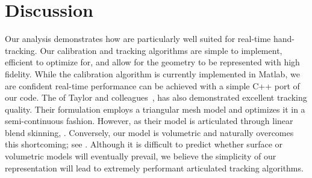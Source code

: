 

\section{Discussion}
\label{sec:discussion}


Our analysis demonstrates how  are particularly well suited for real-time hand-tracking. Our calibration and tracking algorithms are simple to implement, efficient to optimize for, and allow for the geometry to be represented with high fidelity. 
While the calibration algorithm is currently implemented in Matlab, we are confident real-time performance can be achieved with a simple C++ port of our code. 
% 
The  of Taylor and colleagues~\cite{taylor2016joint}, has also demonstrated excellent tracking quality. Their formulation employs a triangular mesh model and optimizes it in a semi-continuous fashion. However, as their model is articulated through linear blend skinning, . Conversely, our model is volumetric and naturally overcomes this shortcoming; see \VideoNoJointCollapse{}.
% 
Although it is difficult to predict whether surface or volumetric models will eventually prevail, we believe the simplicity of our representation will lead to extremely performant articulated tracking algorithms.

